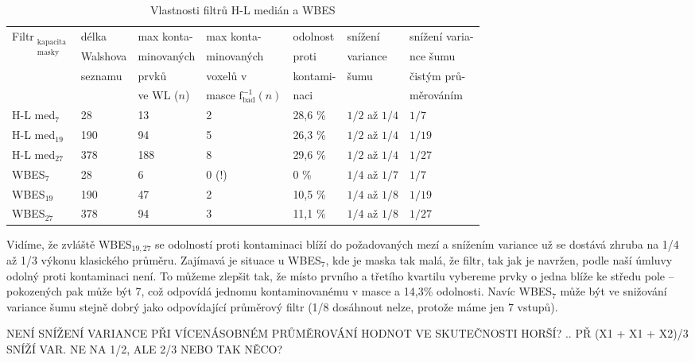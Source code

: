 \begin{table}[h]
    \hspace{-0.6cm}
    \begin{tabular}{lllllll}
      \toprule
      \multirow{4}{*}{Filtr$_{\mathrm{\substack{kapacita\\ masky}}}$} &délka&max konta-& max konta- & odolnost    & snížení    & snížení varia- \\
                                        &Walshova& minovaných & minovaných & proti       & variance   & nce šumu      \\
                                        &seznamu& prvků       & voxelů v   & kontami-    & šumu       & čistým prů-     \\
                                        &       & ve WL ($n$) & masce $\mathrm{f_{bad}^{-1}}(n)$ & naci &  & měrováním  \\
      \midrule
      H-L med$_{\mathrm{7}}$            & 28  & 13  & 2                 & 28,6 \%       & $1/2$ až $1/4$    & $1/7$ \\
      H-L med$_{\mathrm{19}}$           & 190 & 94  & 5                 & 26,3 \%       & $1/2$ až $1/4$    & $1/19$ \\
      H-L med$_{\mathrm{27}}$           & 378 & 188 & 8                 & 29,6 \%       & $1/2$ až $1/4$    & $1/27$  \\
      WBES$_{\mathrm{7}}$               & 28  & 6   & 0 (!)             & 0 \%          & $1/4$ až $1/7$    & $1/7$ \\
      WBES$_{\mathrm{19}}$              & 190 & 47  & 2                 & 10,5 \%       & $1/4$ až $1/8$    & $1/19$ \\
      WBES$_{\mathrm{27}}$              & 378 & 94  & 3                 & 11,1 \%       & $1/4$ až $1/8$    & $1/27$ \\
      \bottomrule
    \end{tabular}
    \caption{Vlastnosti filtrů H-L medián a WBES}
\end{table}\label{tab WBES}

     Vidíme, že zvláště WBES$_{\mathrm{19,27}}$ se odolností proti kontaminaci blíží do požadovaných mezí a snížením variance už se dostává zhruba na 1/4 až 1/3 výkonu klasického průměru. Zajímavá je situace u WBES$_{\mathrm{7}}$, kde je maska tak malá, že filtr, tak jak je navržen, podle naší úmluvy odolný proti kontaminaci není. To můžeme zlepšit tak, že místo prvního a třetího kvartilu vybereme prvky o jedna blíže ke středu pole -- pokozených pak může být 7, což odpovídá jednomu kontaminovanému v masce a 14,3\% odolnosti. Navíc WBES$_{\mathrm{7}}$ může být ve snižování variance šumu stejně dobrý jako odpovídající průměrový filtr (1/8 dosáhnout nelze, protože máme jen 7 vstupů).

     NENÍ SNÍŽENÍ VARIANCE PŘI VÍCENÁSOBNÉM PRŮMĚROVÁNÍ HODNOT VE SKUTEČNOSTI HORŠÍ? .. PŘ (X1 + X1 + X2)/3 SNÍŽÍ VAR. NE NA 1/2, ALE 2/3 NEBO TAK NĚCO?
